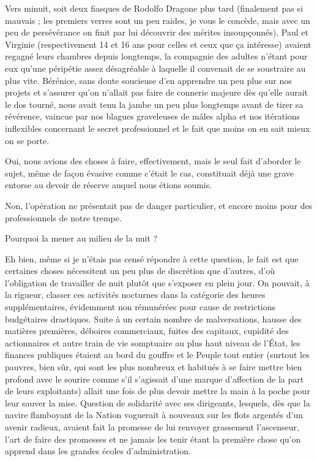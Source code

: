 Vers minuit, soit deux fiasques de Rodolfo Dragone plus tard (finalement pas si mauvais ; les premiers verres sont un peu raides, je vous le concède, mais avec un peu de persévérance on finit par lui découvrir des mérites insoupçonnés), Paul et Virginie (respectivement 14 et 16 ans pour celles et ceux que ça intéresse) avaient regagné leurs chambres depuis longtemps, la compagnie des adultes n’étant pour eux qu’une péripétie assez désagréable à laquelle il convenait de se soustraire au plus vite. Bérénice, sans doute soucieuse d’en apprendre un peu plus sur nos projets et s’assurer qu’on n’allait pas faire de connerie majeure dès qu’elle aurait le dos tourné, nous avait tenu la jambe un peu plus longtemps avant de tirer sa révérence, vaincue par nos blagues graveleuses de mâles alpha et nos itérations inflexibles concernant le secret professionnel et le fait que moins on en sait mieux on se porte.

Oui, nous avions des choses à faire, effectivement, mais le seul fait d’aborder le sujet, même de façon évasive comme c’était le cas, constituait déjà une grave entorse au devoir de réserve auquel nous étions soumis.

Non, l’opération ne présentait pas de danger particulier, et encore moins pour des professionnels de notre trempe.

Pourquoi la mener au milieu de la nuit ?

Eh bien, même si je n’étais pas censé répondre à cette question, le fait est que certaines choses nécessitent un peu plus de discrétion que d’autres, d’où l’obligation de travailler de nuit plutôt que s’exposer en plein jour. On pouvait, à la rigueur, classer ces activités nocturnes dans la catégorie des heures supplémentaires, évidemment non rémunérées pour cause de restrictions budgétaires drastiques. \label{rat:13} Suite à un certain nombre de malversations, hausse des matières premières, déboires commerciaux, fuites des capitaux, cupidité des actionnaires et autre train de vie somptuaire au plus haut niveau de l’État, les finances publiques étaient au bord du gouffre et le Peuple tout entier (surtout les pauvres, bien sûr, qui sont les plus nombreux et habitués à se faire mettre bien profond avec le sourire comme s’il s’agissait d’une marque d’affection de la part de leurs exploitants) allait une fois de plus devoir mettre la main à la poche pour leur sauver la mise. Question de solidarité avec ses dirigeants, lesquels, dès que la navire flamboyant de la Nation voguerait à nouveaux sur les flots argentés d’un avenir radieux, avaient fait la promesse de lui renvoyer grassement l’ascenseur, l’art de faire des promesses et ne jamais les tenir étant la première chose qu’on apprend dans les grandes écoles d’administration.

